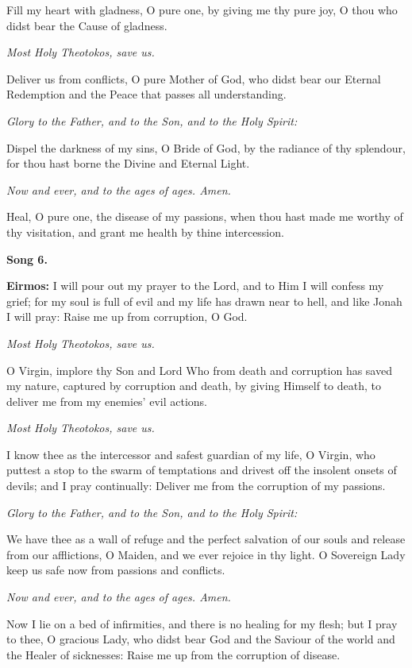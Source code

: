 Fill my heart with gladness, O pure one, by giving me thy pure joy, O thou who didst bear the Cause of gladness.

\emph{Most Holy Theotokos, save us.}

Deliver us from conflicts, O pure Mother of God, who didst bear our Eternal Redemption and the Peace that passes all understanding.

\emph{Glory to the Father, and to the Son, and to the Holy Spirit:}

Dispel the darkness of my sins, O Bride of God, by the radiance of thy splendour, for thou hast borne the Divine and Eternal Light.

\emph{Now and ever, and to the ages of ages. Amen.}

Heal, O pure one, the disease of my passions, when thou hast made me worthy of thy visitation, and grant me health by thine intercession.

\textbf{Song 6.}

\textbf{Eirmos:} 
I will pour out my prayer to the Lord, and to Him I will confess my grief; 
for my soul is full of evil and my life has drawn near to hell, and like Jonah I will pray: 
Raise me up from corruption, O God.

\emph{Most Holy Theotokos, save us.}

O Virgin, implore thy Son and Lord Who from death and corruption has saved my nature, captured by corruption and death, by giving Himself to death, to deliver me from my enemies' evil actions.

\emph{Most Holy Theotokos, save us.}

I know thee as the intercessor and safest guardian of my life, O Virgin, who puttest a stop to the swarm of temptations and drivest off the insolent onsets of devils; 
and I pray continually: Deliver me from the corruption of my passions.

\emph{Glory to the Father, and to the Son, and to the Holy Spirit:}

We have thee as a wall of refuge and the perfect salvation of our souls and release from our afflictions, O Maiden, and we ever rejoice in thy light. 
O Sovereign Lady keep us safe now from passions and conflicts.

\emph{Now and ever, and to the ages of ages. Amen.}

Now I lie on a bed of infirmities, and there is no healing for my flesh; 
but I pray to thee, O gracious Lady, who didst bear God and the Saviour of the world and the Healer of sicknesses: Raise me up from the corruption of disease.

